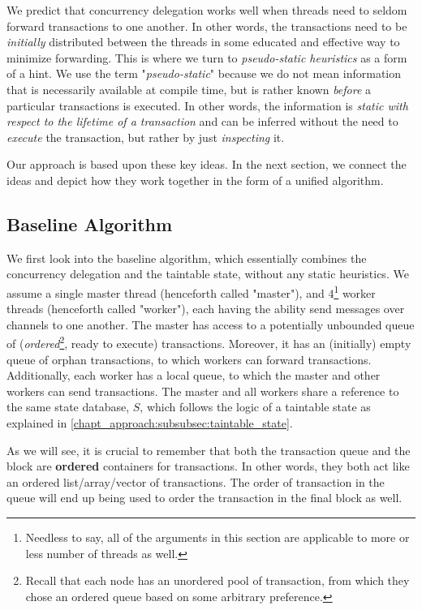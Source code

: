 We predict that concurrency delegation works well when threads need to seldom forward transactions
to one another. In other words, the transactions need to be \textit{initially} distributed between
the threads in some educated and effective way to minimize forwarding. This is where we turn to
\textit{pseudo-static heuristics} as a form of a hint. We use the term "\textit{pseudo-static}"
because we do not mean information that is necessarily available at compile time, but is rather
known \textit{before} a particular transactions is executed. In other words, the information is
\textit{static with respect to the lifetime of a transaction} and can be inferred without the need
to \textit{execute} the transaction, but rather by just \textit{inspecting} it.

Our approach is based upon these key ideas. In the next section, we connect the ideas and
depict how they work together in the form of a unified algorithm.

\subsection{Baseline Algorithm} \label{subsec:baseline_alg}

We first look into the baseline algorithm, which essentially combines the concurrency delegation and
the taintable state, without any static heuristics. We assume a single master thread (henceforth
called "master"), and $4$\footnote{Needless to say, all of the arguments in this section are
applicable to more or less number of threads as well.} worker threads (henceforth called "worker"),
each having the ability send messages over channels to one another. The master has access to a
potentially unbounded queue of (\textit{ordered}\footnote{Recall that each node has an unordered
pool of transaction, from which they chose an ordered queue based on some arbitrary preference.},
ready to execute) transactions. Moreover, it has an (initially) empty queue of orphan transactions,
to which workers can forward transactions. Additionally, each worker has a local queue, to which the
master and other workers can send transactions. The master and all workers share a reference to the
same state database, $S$, which follows the logic of a taintable state as explained in
\ref{chapt_approach:subsubsec:taintable_state}.

\begin{remark}
	As we will see, it is crucial to remember that both the transaction queue and the block are
	\textbf{ordered} containers for transactions. In other words, they both act like an ordered
	list/array/vector of transactions. The order of transaction in the queue will end up being used
	to order the transaction in the final block as well.
\end{remark}

